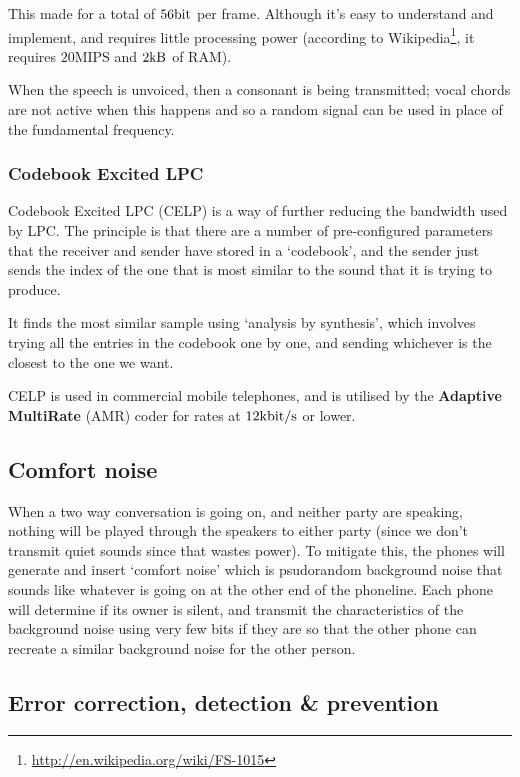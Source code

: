 
This made for a total of $56\si{\bit}$ per frame. Although it's easy to
understand and implement, and requires little processing power (according to
Wikipedia\footnote{\url{http://en.wikipedia.org/wiki/FS-1015}}, it requires
$20$MIPS and $2\si{\kilo\byte}$ of RAM).

When the speech is unvoiced, then a consonant is being transmitted; vocal chords
are not active when this happens and so a random signal can be used in place of
the fundamental frequency.

\subsubsection{Codebook Excited LPC}

Codebook Excited LPC (CELP) is a way of further reducing the bandwidth used by
LPC. The principle is that there are a number of pre-configured parameters that
the receiver and sender have stored in a `codebook', and the sender just sends
the index of the one that is most similar to the sound that it is trying to
produce.

It finds the most similar sample using `analysis by synthesis', which involves
trying all the entries in the codebook one by one, and sending whichever is the
closest to the one we want. 

\label{amr}

CELP is used in commercial mobile telephones, and is utilised by the
\textbf{Adaptive MultiRate} (AMR) coder for rates at
$12\si{\kilo\bit\per\second}$ or lower.

\subsection{Comfort noise}

When a two way conversation is going on, and neither party are speaking, nothing
will be played through the speakers to either party (since we don't transmit
quiet sounds since that wastes power). To mitigate this, the phones will
generate and insert `comfort noise' which is psudorandom background noise that
sounds like whatever is going on at the other end of the phoneline. Each phone
will determine if its owner is silent, and transmit the characteristics of the
background noise using very few bits if they are so that the other phone can
recreate a similar background noise for the other person.

\subsection{Error correction, detection \& prevention}

